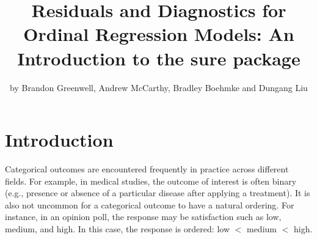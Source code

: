 \title{Residuals and Diagnostics for Ordinal Regression Models: An Introduction to the sure package}
\author{by Brandon Greenwell, Andrew McCarthy, Bradley Boehmke and Dungang Liu}

\maketitle



\section{Introduction}

Categorical outcomes are encountered frequently in practice across different fields. For example, in medical studies, the outcome of interest is often binary (e.g., presence or absence of a particular disease after applying a treatment). It is also not uncommon for a categorical outcome to have a natural ordering. For instance, in an opinion poll, the response may be satisfaction such as low, medium, and high. In this case, the response is ordered: low $<$ medium $<$ high.


